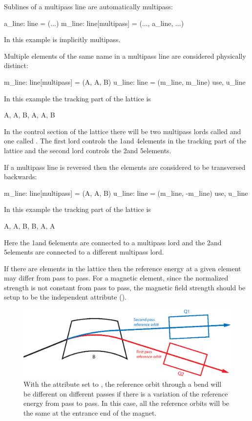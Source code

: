 Sublines of a multipass line are automatically multipass:
\begin{example}
  a_line: line = (...)
  m_line: line[multipass] = (..., a_line, ...)
\end{example}
In this example  is implicitly multipass.

Multiple elements of the same name in a multipass line are considered 
physically distinct:
\begin{example}
  m_line: line[multipass] = (A, A, B)
  u_line: line = (m_line, m_line)
  use, u_line
\end{example}
In this example the tracking part of the lattice is
\begin{example}
  A, A, B, A, A, B
\end{example}
In the control section of the lattice there will be two multipass
lords called  and one called . The first  lord 
controls the 1\St and 4\Th elements in the tracking part of the lattice 
and the second  lord controls the 2\Nd and 5\Th elements.

If a multipass line is reversed then the elements are considered to be
transversed backwards:
\begin{example}
  m_line: line[multipass] = (A, A, B)
  u_line: line = (m_line, -m_line)
  use, u_line
\end{example}
In this example the tracking part of the lattice is
\begin{example}
  A, A, B, B, A, A
\end{example}
Here the 1\St and 6\Th elements are connected to a multipass lord and the
2\Nd and 5\Th elements are connected to a different multipass lord.

If there are  elements in the lattice then the reference
energy at a given element may differ from pass to pass. For a magnetic
element, since the normalized strength is not constant from pass to
pass, the magnetic field strength should be setup to be the
independent attribute (). 

\begin{figure}[tb]
\centering 
\includegraphics{multipass_bend.eps} 
\caption[The reference orbit with a multipass bend.] 
{With the  attribute set to
, the reference orbit through a bend will be
different on different passes if there is a variation of the reference
energy from pass to pass. In this case, all the reference orbits will
be the same at the entrance end of the magnet.}
\label{f:multipass_bend}
\end{figure}

